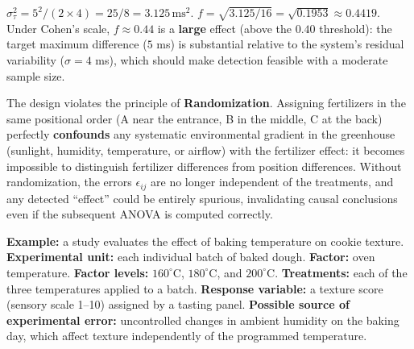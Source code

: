 \begin{solproblema}
$\sigma_\tau^2 = 5^2/(2\times4) = 25/8 = 3.125\,\text{ms}^2$. $f = \sqrt{3.125/16} = \sqrt{0.1953}\approx0.4419$. Under Cohen's scale, $f\approx0.44$ is a \textbf{large} effect (above the $0.40$ threshold): the target maximum difference ($5$ ms) is substantial relative to the system's residual variability ($\sigma=4$ ms), which should make detection feasible with a moderate sample size.
\end{solproblema}

\begin{solproblema}[prob:257933a]
The design violates the principle of \textbf{Randomization}. Assigning fertilizers in the same positional order (A near the entrance, B in the middle, C at the back) perfectly \textbf{confounds} any systematic environmental gradient in the greenhouse (sunlight, humidity, temperature, or airflow) with the fertilizer effect: it becomes impossible to distinguish fertilizer differences from position differences. Without randomization, the errors $\epsilon_{ij}$ are no longer independent of the treatments, and any detected ``effect'' could be entirely spurious, invalidating causal conclusions even if the subsequent ANOVA is computed correctly.
\end{solproblema}

\begin{solproblema}[prob:fb4917f]
\textbf{Example:} a study evaluates the effect of baking temperature on cookie texture. \textbf{Experimental unit:} each individual batch of baked dough. \textbf{Factor:} oven temperature. \textbf{Factor levels:} $160^\circ$C, $180^\circ$C, and $200^\circ$C. \textbf{Treatments:} each of the three temperatures applied to a batch. \textbf{Response variable:} a texture score (sensory scale 1--10) assigned by a tasting panel. \textbf{Possible source of experimental error:} uncontrolled changes in ambient humidity on the baking day, which affect texture independently of the programmed temperature.
\end{solproblema}
